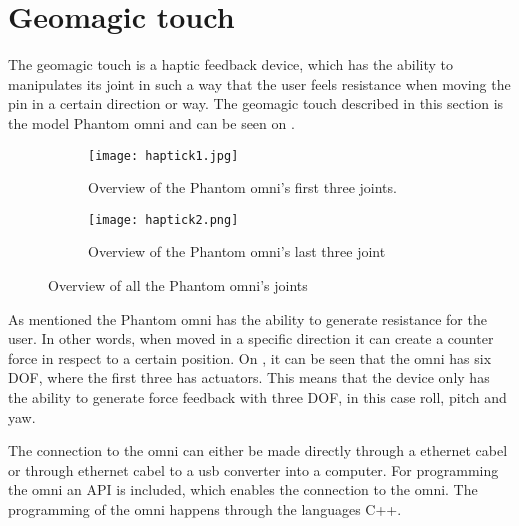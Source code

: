 \section{Geomagic touch}\label{sec:geo_magic}
The geomagic touch is a haptic feedback device, which has the ability to manipulates its joint in such a way that the user feels resistance when moving the pin in a certain direction or way. The geomagic touch described in this section is the model Phantom omni and can be seen on .

\begin{figure}[H]
	\centering
	\begin{subfigure}{.45\textwidth}
		\centering
		\texttt{[image: haptick1.jpg]}
		\caption{Overview of the Phantom omni's first three joints.}
		\label{fig:phantom1}
	\end{subfigure}
	\begin{subfigure}{.45\textwidth}
		\centering
		\texttt{[image: haptick2.png]}
		\caption{Overview of the Phantom omni's last three joint}
		\label{fig:phantom2}
	\end{subfigure}
\caption{Overview of all the Phantom omni's joints\citep{phantom_omni}}
\label{fig:phantom_omni}
\end{figure}

As mentioned the Phantom omni has the ability to generate resistance for the user. In other words, when moved in a specific direction it can create a counter force in respect to a certain position. On , it can be seen that the omni has six \gls{DOF}, where the first three has actuators. This means that the device only has the ability to generate force feedback with three \gls{DOF}, in this case roll, pitch and yaw.

The connection to the omni can either be made directly through a ethernet cabel or through ethernet cabel to a usb converter into a computer. For programming the omni an API is included, which enables the connection to the omni. The programming of the omni happens through the languages C++. 


